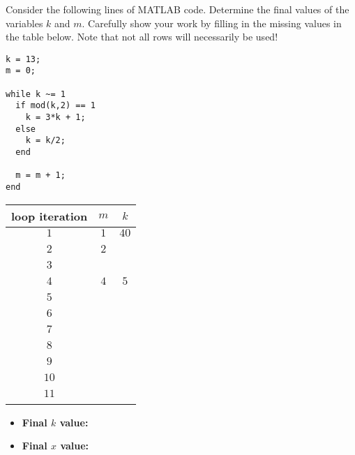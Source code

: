 \documentclass[11pt]{exam}
\theoremstyle{definition}
\begin{document}
\begin{questions}

\addpoints

\question[10]\mbox{}

Consider the following lines of MATLAB code.  Determine the final values of the variables $k$ and $m$.  Carefully show your work by filling in the missing values in the table below.  Note that not all rows will necessarily be used!

\begin{lstlisting}
k = 13;
m = 0;

while k ~= 1
  if mod(k,2) == 1
    k = 3*k + 1;
  else
    k = k/2;
  end

  m = m + 1;
end
\end{lstlisting}

\vspace{0.5in}

\begin{center}
\begin{tabular}{|c|c|c|}\hline
loop iteration & $m$ & $k$\\\hline
 $1$ & $1$  & $40$ \\\hline&&\\
 $2$ & $2$  &      \\\hline&&\\
 $3$ &      &      \\\hline&&\\
 $4$ & $4$  &  $5$ \\\hline&&\\
 $5$ &      &      \\\hline&&\\
 $6$ &      &      \\\hline&&\\
 $7$ &&\\\hline&&\\
 $8$ &&\\\hline&&\\
 $9$ &&\\\hline&&\\
$10$ &&\\\hline&&\\
$11$ &&\\\hline&&\\
\end{tabular}
\end{center}

\vspace{0.3in}

\begin{itemize}
\item \textbf{Final $k$ value:}
\item \textbf{Final $x$ value:}
\end{itemize}



\end{questions}
\end{document}
